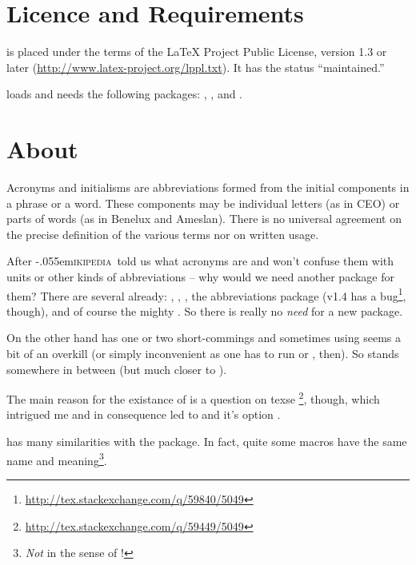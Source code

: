 \documentclass[DIV10,toc=index,toc=bib]{cnpkgdoc}
\newcommand*\wikipedia{\libertineGlyph{W.alt}\kern-.055em\textsc{ikipedia}}
\begin{document}
\newpage
\section{Licence and Requirements}
\acro is placed under the terms of the LaTeX Project Public License,
version 1.3 or later (\url{http://www.latex-project.org/lppl.txt}).
It has the status ``maintained.''

\acro loads and needs the following packages: ,
,  and .

\section{About}
\begin{zitat}
 Acronyms and initialisms are abbreviations formed from the initial components
 in a phrase or a word. These components may be individual letters (as in CEO)
 or parts of words (as in Benelux and Ameslan). There is no universal agreement
 on the precise definition of the various terms nor on written usage.
\end{zitat}
After \wikipedia\ told us what acronyms are and won't confuse them with units or
other kinds of abbreviations -- why would we need another package for them? There
are several already:  \cite{acronym},  \cite{acromake},
 \cite{acroterm}, the abbreviations package 
\cite{abbrevs} (v1.4 has a bug\footnote{\url{http://tex.stackexchange.com/q/59840/5049}},
though), and of course the mighty  \cite{glossaries}. So there
is really no \emph{need} for a new package.

On the other hand  has one or two short-commings and sometimes
using  seems a bit of an overkill (or simply inconvenient as
one has to run  or , then). So \acro stands
somewhere in between (but much closer to ).

The main reason for the existance of \acro is a question on \acs{texse}%
\footnote{\url{http://tex.stackexchange.com/q/59449/5049}}, though, which intrigued
me and in consequence led to \acro and it's option .

\acro has many similarities with the  package. In fact, quite
some macros have the same name and meaning\footnote{\emph{Not} in the sense of
\code{\textbackslash\textcolor{code}{meaning}}!}.
\end{document}
